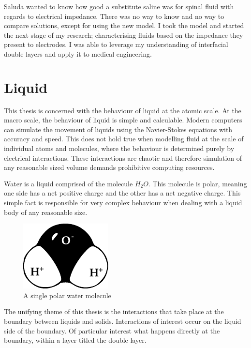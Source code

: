 Saluda wanted to know how good a substitute saline was for spinal fluid with regards to electrical impedance.
There was no way to know and no way to compare solutions, except for using the new model.
I took the model and started the next stage of my research; characterising fluids based on the impedance they present to electrodes.
I was able to leverage my understanding of interfacial double layers and apply it to medical engineering.



\section{Liquid}
This thesis is concerned with the behaviour of liquid at the atomic scale.
At the macro scale, the behaviour of liquid is simple and calculable.
Modern computers can simulate the movement of liquids using the Navier-Stokes equations with accuracy and speed.
This does not hold true when modelling fluid at the scale of individual atoms and molecules, where the behaviour is determined purely by electrical interactions.
These interactions are chaotic and therefore simulation of any reasonable sized volume demands prohibitive computing resources.

Water is a liquid comprised of the molecule $H_{2}O$.
This molecule is polar, meaning one side has a net positive charge and the other has a net negative charge.
This simple fact is responsible for very complex behaviour when dealing with a liquid body of any reasonable size.

\begin{figure}
    \begin{center}
        \includegraphics{content/introduction/graphics/polarWater}
    \end{center}
    \caption{A single polar water molecule}
    \label{fig:waterMolecule}
\end{figure}

The unifying theme of this thesis is the interactions that take place at the boundary between liquids and solids.
Interactions of interest occur on the liquid side of the boundary.
Of particular interest what happens directly at the boundary, within a layer titled the double layer.

